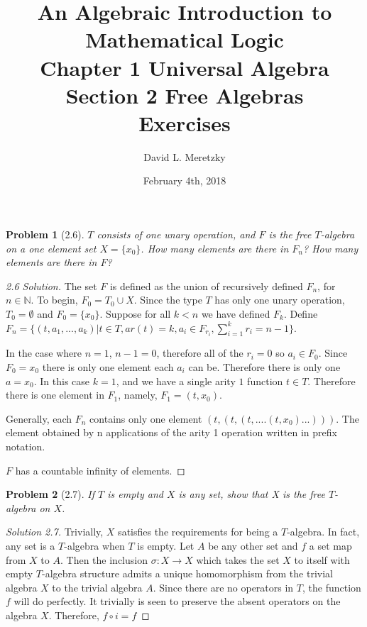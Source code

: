 \documentclass{article}
\title{ \vspace{-10ex} %
An Algebraic Introduction to Mathematical Logic\\
Chapter 1 Universal Algebra \\
Section 2 Free Algebras \\
Exercises 
}
\author{David L. Meretzky
}
\date{%
February 4th, 2018
}
\theoremstyle{problemstyle}
\newtheorem{problem}{Problem}
\begin{document}
\maketitle

\begin{problem}[2.6] 
$T$ consists of one unary operation, and $F$ is the free $T$-algebra on a one element set $X = \{x_0\}$. How many elements are there in $F_n$? How many elements are there in $F$?
\end{problem}

\begin{proof}[2.6 Solution]
The set $F$ is defined as the union of recursively defined $F_n$, for $n \in \mathbb{N}$.  To begin, $F_0 = T_0 \cup X$. Since the type $T$ has only one unary operation, $T_0 = \emptyset$ and $F_0 = \{x_0\}$. Suppose for all $k < n$ we have defined $F_k$. Define $F_n = \{(t, a_1, ..., a_k)|t \in T, ar(t) = k, a_i \in F_{r_i}, \sum_{i=1}^{k} r_i = n - 1 \}$. 

In the case where $n = 1$, $n-1 = 0$, therefore all of the $r_i = 0$ so $a_i \in F_0$. Since $F_0 = {x_0}$ there is only one element each $a_i$ can be. Therefore there is only one $a = x_0$. In this case $k = 1$, and we have a single arity $1$ function $t \in T$. Therefore there is one element in $F_1$, namely, $F_1 = {(t, x_0)}$. 

Generally, each $F_n$ contains only one element $(t,(t,(t,....(t,x_0)...)))$. The element obtained by n applications of the arity 1 operation written in prefix notation. 

$F$ has a countable infinity of elements. 
\end{proof}

\begin{problem}[2.7] 
If $T$ is empty and $X$ is any set, show that X is the free $T$-algebra on $X$. 
\end{problem}
\begin{proof}[Solution 2.7] 
Trivially, $X$ satisfies the requirements for being a $T$-algebra. In fact, any set is a $T$-algebra when $T$ is empty. Let $A$ be any other set and $f$ a set map from $X$ to $A$. Then the inclusion $\sigma:X\rightarrow X$ which takes the set $X$ to itself with empty $T$-algebra structure admits a unique homomorphism from the trivial algebra $X$ to the trivial algebra $A$. Since there are no operators in $T$, the function $f$ will do perfectly. It trivially is seen to preserve the absent operators on the algebra $X$. Therefore, $f\circ i = f$
\end{proof}
\end{document}
